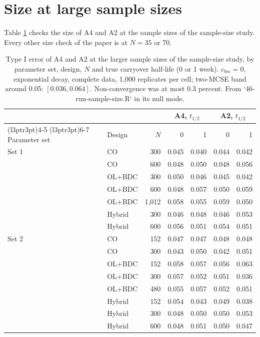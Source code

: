 \documentclass[
  11pt,
]{article}
\begin{document}
\section{Size at large sample sizes}\label{size-at-large-sample-sizes}

Table \ref{tab:ss-null} checks the size of A4 and A2 at the sample
sizes of the sample-size study. Every other size check of the paper is
at \(N = 35\) or 70.

\begin{table}
\centering
\caption{\label{tab:ss-null}Type I error of A4 and A2 at the larger sample sizes of
    the sample-size study, by parameter set, design, $N$ and true
    carryover half-life (0 or 1 week). $c_{bm} = 0$, exponential
    decay, complete data, 1,000 replicates per cell; two-MCSE band
    around 0.05: $[0.036, 0.064]$. Non-convergence was at most 0.3
    percent. From `46-run-sample-size.R` in its null mode.}
\centering
\fontsize{9}{11}\selectfont
\begin{tabular}[t]{llrrrrr}
\toprule
\multicolumn{3}{c}{ } & \multicolumn{2}{c}{A4, $t_{1/2}$} & \multicolumn{2}{c}{A2, $t_{1/2}$} \\
\cmidrule(l{3pt}r{3pt}){4-5} \cmidrule(l{3pt}r{3pt}){6-7}
Parameter set & Design & $N$ & 0 & 1 & 0 & 1\\
\midrule
Set 1 & CO & 300 & 0.045 & 0.040 & 0.044 & 0.042\\
 & CO & 600 & 0.048 & 0.050 & 0.048 & 0.056\\
 & OL+BDC & 300 & 0.050 & 0.046 & 0.045 & 0.042\\
 & OL+BDC & 600 & 0.048 & 0.057 & 0.050 & 0.059\\
 & OL+BDC & 1,012 & 0.058 & 0.055 & 0.059 & 0.050\\
 & Hybrid & 300 & 0.046 & 0.048 & 0.046 & 0.053\\
 & Hybrid & 600 & 0.056 & 0.051 & 0.054 & 0.051\\
Set 2 & CO & 152 & 0.047 & 0.047 & 0.048 & 0.048\\
 & CO & 300 & 0.043 & 0.050 & 0.042 & 0.051\\
 & OL+BDC & 152 & 0.058 & 0.057 & 0.056 & 0.063\\
 & OL+BDC & 300 & 0.057 & 0.052 & 0.051 & 0.036\\
 & OL+BDC & 480 & 0.055 & 0.057 & 0.052 & 0.051\\
 & Hybrid & 152 & 0.054 & 0.043 & 0.049 & 0.038\\
 & Hybrid & 300 & 0.048 & 0.050 & 0.050 & 0.053\\
 & Hybrid & 600 & 0.048 & 0.051 & 0.050 & 0.047\\
\bottomrule
\end{tabular}
\end{table}
\end{document}
